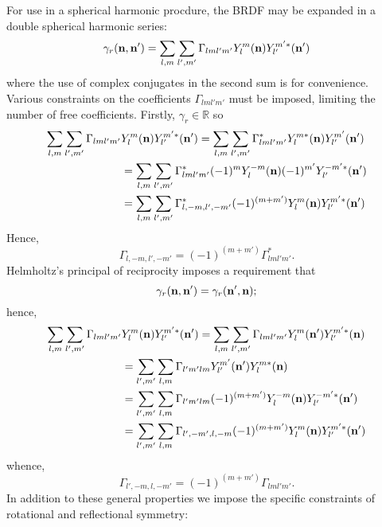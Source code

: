 	For use in a spherical harmonic procdure, the BRDF may be expanded
in a double spherical harmonic series:
\begin{equation}
\gamma_r(\mathbf{n},\mathbf{n}') = \sum_{l,m} \sum_{l',m'} \Gamma_{lml'm'} Y_l^m(\mathbf{n})
Y_{l'}^{m'*} (\mathbf{n}')
\end{equation}
where the use of complex conjugates in the second sum is for convenience.
Various constraints on the coefficients $\Gamma_{lml'm'}$ must be
imposed, limiting the number of free coefficients. Firstly, $ \gamma_r \in
\mathbb{R}$ so
\begin{equation}
\begin{split}
\sum_{l,m} \sum_{l',m'} \Gamma_{lml'm'} &Y_l^m(\mathbf{n}) Y_{l'}^{m'*} (\mathbf{n}') 
=\sum_{l,m} \sum_{l',m'} \Gamma_{lml'm'}^* Y_l^{m*}(\mathbf{n}) Y_{l'}^{m'} (\mathbf{n}') \\
&=\sum_{l,m} \sum_{l',m'} \Gamma_{lml'm'}^* (-1)^m Y_l^{-m}(\mathbf{n}) (-1)^{m'} 
Y_{l'}^{-m'*} (\mathbf{n}') \\
&=\sum_{l,m} \sum_{l',m'} \Gamma_{l,-m,l',-m'}^* (-1)^{(m+m')} Y_l^{m}(\mathbf{n}) 
Y_{l'}^{m'*} (\mathbf{n}')
\end{split}
\end{equation}
Hence,
\begin{equation}
\Gamma_{l,-m,l',-m'}=(-1)^{(m+m')} \Gamma_{lml'm'}^*.
\end{equation}
Helmholtz's principal of reciprocity imposes a requirement that
\begin{equation}
\gamma_r(\mathbf{n},\mathbf{n}') = \gamma_r(\mathbf{n}',\mathbf{n});
\end{equation}
hence,
\begin{equation}
\begin{split}
\sum_{l,m} \sum_{l',m'} \Gamma_{lml'm'} &Y_l^m(\mathbf{n}) Y_{l'}^{m'*} (\mathbf{n}') 
=\sum_{l,m} \sum_{l',m'} \Gamma_{lml'm'} Y_l^m(\mathbf{n}') Y_{l'}^{m'*} (\mathbf{n}) \\
&=\sum_{l',m'} \sum_{l,m} \Gamma_{l'm'lm} Y_{l'}^{m'}(\mathbf{n}') Y_l^{m*} (\mathbf{n}) \\
&=\sum_{l',m'} \sum_{l,m} \Gamma_{l'm'lm} (-1)^{(m+m')} Y_l^{-m}(\mathbf{n}) 
Y_{l'}^{-m'*} (\mathbf{n}') \\
&=\sum_{l',m'} \sum_{l,m} \Gamma_{l',-m',l,-m} (-1)^{(m+m')} Y_l^m(\mathbf{n}) 
Y_{l'}^{m'*} (\mathbf{n}')
\end{split}
\end{equation}
whence,
\begin{equation}
\Gamma_{l',-m,l,-m'}=(-1)^{(m+m')} \Gamma_{lml'm'}.
\end{equation}
In addition to these general properties we impose the specific constraints
of rotational and reflectional symmetry:
